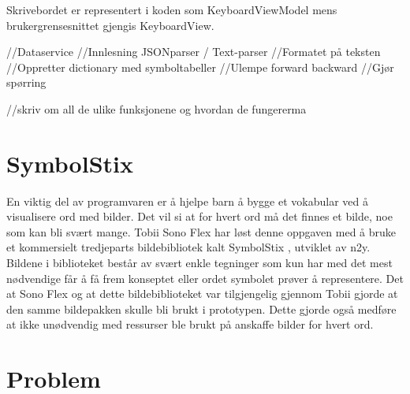 {Skrivebordet er representert i koden som KeyboardViewModel mens brukergrensesnittet gjengis KeyboardView. 


//Dataservice
//Innlesning JSONparser / Text-parser
    //Formatet på teksten
    //Oppretter dictionary med symboltabeller
    //Ulempe forward backward
    //Gjør spørring
    




 
 //skriv om all de ulike funksjonene og hvordan de fungererma
 
 
 
 
 
 
 
 
 
 
 
 
 
 
 
 
 
 
 
 
 
 
 
 
\section{SymbolStix} 
 
 
En viktig del av programvaren er å hjelpe barn å bygge et vokabular ved å visualisere ord med bilder. Det vil si at for hvert ord må det finnes et bilde, noe som kan bli svært mange. Tobii Sono Flex har løst denne oppgaven med å bruke et kommersielt tredjeparts bildebibliotek kalt SymbolStix \cite{n2y}, utviklet av n2y. Bildene i biblioteket består av svært enkle tegninger som kun har med det mest nødvendige får å få frem konseptet eller ordet symbolet prøver å representere. Det at Sono Flex og at dette bildebiblioteket var tilgjengelig gjennom Tobii gjorde at den samme bildepakken skulle bli brukt i prototypen. Dette gjorde også medføre at ikke unødvendig med ressurser ble brukt på anskaffe bilder for hvert ord. 
 
 
 
 
\section{Problem} 
 
}
